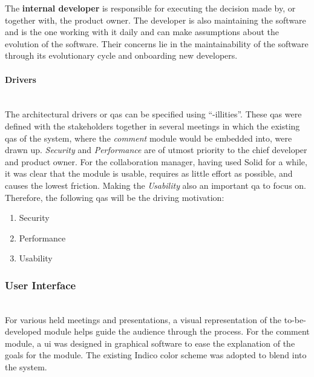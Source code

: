 The \textbf{internal developer} is responsible for executing the decision made by, or together with, the product owner. The developer is also maintaining the software and is the one working with it daily and can make assumptions about the evolution of the software. Their concerns lie in the maintainability of the software through its evolutionary cycle and onboarding new developers.
\vspace{0.5cm}
\paragraph{Drivers}\mbox{}\\

The architectural drivers or \glspl{qa} can be specified using “-illities”. These \glspl{qa} were defined with the stakeholders together in several meetings in which the existing \glspl{qa} of the system, where the \textit{comment} module would be embedded into, were drawn up. \textit{Security} and \textit{Performance} are of utmost priority to the chief developer and product owner. For the collaboration manager, having used Solid for a while, it was clear that the module is usable, requires as little effort as possible, and causes the lowest friction. Making the \textit{Usability} also an important \gls{qa} to focus on. Therefore, the following \glspl{qa} will be the driving motivation:

\begin{enumerate}
    \item Security
    \item Performance
    \item Usability
\end{enumerate}

\subsubsection{User Interface}\mbox{}\\

For various held meetings and presentations, a visual representation of the to-be-developed module helps guide the audience through the process. For the comment module, a \gls{ui} was designed in graphical software to ease the explanation of the goals for the module. The existing Indico color scheme was adopted to blend into the system.

